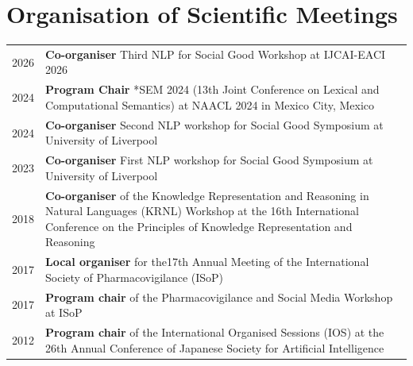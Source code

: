 \documentclass[a4paper,11pt]{article}
\begin{document}
\section{Organisation of Scientific Meetings}
\begin{tabular}{r p{13cm}}
\textsc{2026} & \textbf{Co-organiser} Third NLP for Social Good Workshop at IJCAI-EACI 2026\\
\textsc{2024} & \textbf{Program Chair} *SEM 2024 (13th Joint Conference on Lexical and Computational Semantics) at NAACL 2024 in Mexico City, Mexico\\
\textsc{2024} & \textbf{Co-organiser} Second NLP workshop for Social Good Symposium at University of Liverpool\\
\textsc{2023} & \textbf{Co-organiser} First NLP workshop for Social Good Symposium at University of Liverpool\\
\textsc{2018} & \textbf{Co-organiser} of the Knowledge Representation and Reasoning in Natural Languages (KRNL) Workshop at the 16th International Conference on the Principles of Knowledge Representation and Reasoning\\
\textsc{2017} & \textbf{Local organiser} for the17th Annual Meeting of the International Society of Pharmacovigilance (ISoP)\\
\textsc{2017} & \textbf{Program chair} of the Pharmacovigilance and Social Media Workshop at ISoP\\
\textsc{2012} & \textbf{Program chair} of the International Organised Sessions (IOS) at the 26th Annual Conference of Japanese Society for Artificial Intelligence
\end{tabular}
\end{document}
